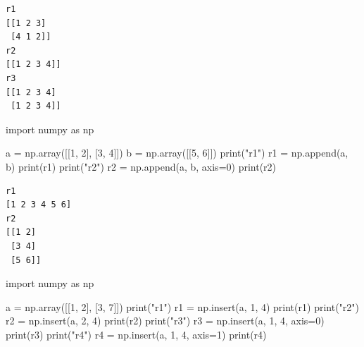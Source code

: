 \documentclass[
  polish,
  letterpaper,
  DIV=11,
  numbers=noendperiod]{scrreprt}
\newenvironment{Shaded}{\begin{snugshade}}{\end{snugshade}}
\newcommand{\BuiltInTok}[1]{\textcolor[rgb]{0.00,0.23,0.31}{#1}}
\newcommand{\DecValTok}[1]{\textcolor[rgb]{0.68,0.00,0.00}{#1}}
\newcommand{\ImportTok}[1]{\textcolor[rgb]{0.00,0.46,0.62}{#1}}
\newcommand{\NormalTok}[1]{\textcolor[rgb]{0.00,0.23,0.31}{#1}}
\newcommand{\OperatorTok}[1]{\textcolor[rgb]{0.37,0.37,0.37}{#1}}
\newcommand{\StringTok}[1]{\textcolor[rgb]{0.13,0.47,0.30}{#1}}
\begin{document}
\begin{verbatim}
r1
[[1 2 3]
 [4 1 2]]
r2
[[1 2 3 4]]
r3
[[1 2 3 4]
 [1 2 3 4]]
\end{verbatim}

\begin{Shaded}
\begin{Highlighting}[]
\ImportTok{import}\NormalTok{ numpy }\ImportTok{as}\NormalTok{ np}

\NormalTok{a }\OperatorTok{=}\NormalTok{ np.array([[}\DecValTok{1}\NormalTok{, }\DecValTok{2}\NormalTok{], [}\DecValTok{3}\NormalTok{, }\DecValTok{4}\NormalTok{]])}
\NormalTok{b }\OperatorTok{=}\NormalTok{ np.array([[}\DecValTok{5}\NormalTok{, }\DecValTok{6}\NormalTok{]])}
\BuiltInTok{print}\NormalTok{(}\StringTok{"r1"}\NormalTok{)}
\NormalTok{r1 }\OperatorTok{=}\NormalTok{ np.append(a, b)}
\BuiltInTok{print}\NormalTok{(r1)}
\BuiltInTok{print}\NormalTok{(}\StringTok{"r2"}\NormalTok{)}
\NormalTok{r2 }\OperatorTok{=}\NormalTok{ np.append(a, b, axis}\OperatorTok{=}\DecValTok{0}\NormalTok{)}
\BuiltInTok{print}\NormalTok{(r2)}
\end{Highlighting}
\end{Shaded}

\begin{verbatim}
r1
[1 2 3 4 5 6]
r2
[[1 2]
 [3 4]
 [5 6]]
\end{verbatim}

\begin{Shaded}
\begin{Highlighting}[]
\ImportTok{import}\NormalTok{ numpy }\ImportTok{as}\NormalTok{ np}

\NormalTok{a }\OperatorTok{=}\NormalTok{ np.array([[}\DecValTok{1}\NormalTok{, }\DecValTok{2}\NormalTok{], [}\DecValTok{3}\NormalTok{, }\DecValTok{7}\NormalTok{]])}
\BuiltInTok{print}\NormalTok{(}\StringTok{"r1"}\NormalTok{)}
\NormalTok{r1 }\OperatorTok{=}\NormalTok{ np.insert(a, }\DecValTok{1}\NormalTok{, }\DecValTok{4}\NormalTok{)}
\BuiltInTok{print}\NormalTok{(r1)}
\BuiltInTok{print}\NormalTok{(}\StringTok{"r2"}\NormalTok{)}
\NormalTok{r2 }\OperatorTok{=}\NormalTok{ np.insert(a, }\DecValTok{2}\NormalTok{, }\DecValTok{4}\NormalTok{)}
\BuiltInTok{print}\NormalTok{(r2)}
\BuiltInTok{print}\NormalTok{(}\StringTok{"r3"}\NormalTok{)}
\NormalTok{r3 }\OperatorTok{=}\NormalTok{ np.insert(a, }\DecValTok{1}\NormalTok{, }\DecValTok{4}\NormalTok{, axis}\OperatorTok{=}\DecValTok{0}\NormalTok{)}
\BuiltInTok{print}\NormalTok{(r3)}
\BuiltInTok{print}\NormalTok{(}\StringTok{"r4"}\NormalTok{)}
\NormalTok{r4 }\OperatorTok{=}\NormalTok{ np.insert(a, }\DecValTok{1}\NormalTok{, }\DecValTok{4}\NormalTok{, axis}\OperatorTok{=}\DecValTok{1}\NormalTok{)}
\BuiltInTok{print}\NormalTok{(r4)}
\end{Highlighting}
\end{Shaded}
\end{document}
